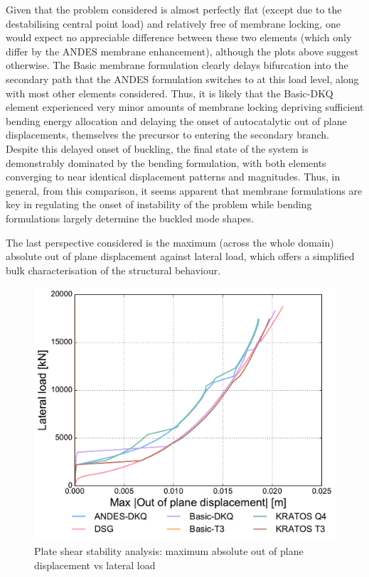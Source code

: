 Given that the problem considered is almost perfectly flat (except due to the destabilising central point load) and relatively free of membrane locking, one would expect no appreciable difference between these two elements (which only differ by the ANDES membrane enhancement), although the plots above suggest otherwise. The Basic membrane formulation clearly delays bifurcation into the secondary path that the ANDES formulation switches to at this load level, along with most other elements considered. Thus, it is likely that the Basic-DKQ element experienced very minor amounts of membrane locking depriving sufficient bending energy allocation and delaying the onset of autocatalytic out of plane displacements, themselves the precursor to entering the secondary branch. Despite this delayed onset of buckling, the final state of the system is demonstrably dominated by the bending formulation, with both elements converging to near identical displacement patterns and magnitudes. Thus, in general, from this comparison, it seems apparent that membrane formulations are key in regulating the onset of instability of the problem while bending formulations largely determine the buckled mode shapes.

The last perspective considered is the maximum (across the whole domain) absolute out of plane displacement against lateral load, which offers a simplified bulk characterisation of the structural behaviour.

\begin{figure}[H]
	\centering
	\def\svgwidth{\columnwidth}
	\includegraphics[width=12cm]{images/stability_wrinkle_abstrans_disp.pdf}
	\caption{Plate shear stability analysis: maximum absolute out of plane displacement vs lateral load}
	\label{pic:wrinkle3}
\end{figure}


